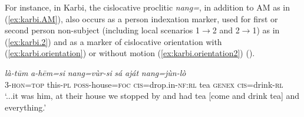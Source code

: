 \documentclass[oneside,a4paper,11pt]{article}
\newcommand{\ipa}[1]{{\phon\textit{#1}}}
\newcommand{\zh}[1]{{\cn #1}}
\newcommand{\rouge}[1]{{\color{red}#1}}
\newcommand{\gray}[1]{\cellcolor{lightgray!30}{#1}}
\begin{document}



For instance, in Karbi, the cislocative proclitic \ipa{nang=}, in addition to AM as in (\ref{ex:karbi.AM}), also occurs as a person indexation marker, used for first or second person non-subject (including local scenarios 1$\rightarrow$2  and 2$\rightarrow$1) as in (\ref{ex:karbi.2}) and as a marker of cislocative orientation with (\ref{ex:karbi.orientation}) or without motion (\ref{ex:karbi.orientation2}) (\citet{konnerth15cisloc}).

\begin{exe}
\ex \label{ex:karbi.AM}
\gll \ipa{alàng-lì=ke}	\ipa{là-tūm}	\ipa{a-hēm=si}	\ipa{\rouge{nang}=vùr-si}	\ipa{sá}	\ipa{aját}	\ipa{\rouge{nang}=jùn-lò} \\
 3-\textsc{hon}=\textsc{top} this-\textsc{pl} \textsc{poss}-house=\textsc{foc} \rouge{\textsc{cis}}=drop.in-\textsc{nf}:\textsc{rl} tea \textsc{genex} \rouge{\textsc{cis}}=drink-\textsc{rl} \\
 \glt `...it was him, at their house we stopped by and had tea [{come} and drink tea] and everything.'
\end{exe}
\end{document}
